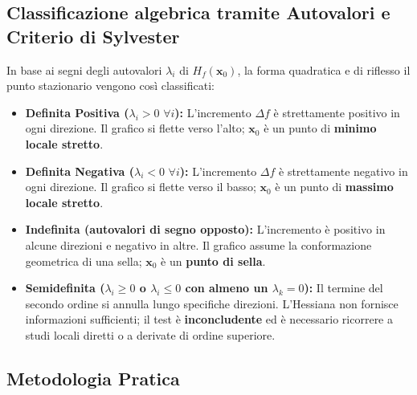 \subsection{Classificazione algebrica tramite Autovalori e Criterio di Sylvester}
In base ai segni degli autovalori $\lambda_i$ di $H_f(\mathbf{x}_0)$, la forma quadratica e di riflesso il punto stazionario vengono così classificati:
\begin{itemize}
    \item \textbf{Definita Positiva ($\lambda_i > 0 \,\, \forall i$):} L'incremento $\Delta f$ è strettamente positivo in ogni direzione. Il grafico si flette verso l'alto; $\mathbf{x}_0$ è un punto di \textbf{minimo locale stretto}.
    \item \textbf{Definita Negativa ($\lambda_i < 0 \,\, \forall i$):} L'incremento $\Delta f$ è strettamente negativo in ogni direzione. Il grafico si flette verso il basso; $\mathbf{x}_0$ è un punto di \textbf{massimo locale stretto}.
    \item \textbf{Indefinita (autovalori di segno opposto):} L'incremento è positivo in alcune direzioni e negativo in altre. Il grafico assume la conformazione geometrica di una sella; $\mathbf{x}_0$ è un \textbf{punto di sella}.
    \item \textbf{Semidefinita ($\lambda_i \ge 0$ o $\lambda_i \le 0$ con almeno un $\lambda_k = 0$):} Il termine del secondo ordine si annulla lungo specifiche direzioni. L'Hessiana non fornisce informazioni sufficienti; il test è \textbf{inconcludente} ed è necessario ricorrere a studi locali diretti o a derivate di ordine superiore.
\end{itemize}

\subsection{Metodologia Pratica}

